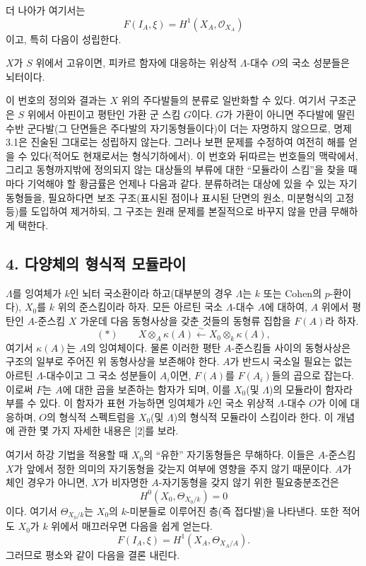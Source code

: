 더 나아가 여기서는
\[
  F(I_A,\xi)=H^1(X_A,\mathcal O_{X_A})
\]
이고, 특히 다음이 성립한다.

 $X$가 $S$ 위에서 고유이면, 피카르 함자에 대응하는
위상적 $\Lambda$-대수 $O$의 국소 성분들은 뇌터이다.

 이 번호의 정의와 결과는 $X$ 위의 주다발들의 분류로
일반화할 수 있다. 여기서 구조군은 $S$ 위에서 아핀이고 평탄인 가환 군
스킴 $G$이다. $G$가 가환이 아니면 주다발에 딸린 수반 군다발(그 단면들은
주다발의 자기동형들이다)이 더는 자명하지 않으므로, 명제 3.1은 진술된
그대로는 성립하지 않는다. 그러나 보편 문제를 수정하여 여전히 해를 얻을
수 있다(적어도 현재로서는 형식기하에서). 이 번호와 뒤따르는 번호들의
맥락에서, 그리고 동형까지밖에 정의되지 않는 대상들의 부류에 대한
``모듈라이 스킴''을 찾을 때마다 기억해야 할 황금률은 언제나 다음과 같다.
분류하려는 대상에 있을 수 있는 자기동형들을, 필요하다면 보조 구조(표시된
점이나 표시된 단면의 원소, 미분형식의 고정 등)를 도입하여 제거하되, 그
구조는 원래 문제를 본질적으로 바꾸지 않을 만큼 무해하게 택한다.

\subsection*{4. 다양체의 형식적 모듈라이}

$\Lambda$를 잉여체가 $k$인 뇌터 국소환이라 하고(대부분의 경우
$\Lambda$는 $k$ 또는 Cohen의 $p$-환이다), $X_0$를 $k$ 위의 준스킴이라
하자. 모든 아르틴 국소 $\Lambda$-대수 $A$에 대하여, $A$ 위에서 평탄인
$A$-준스킴 $X$ 가운데 다음 동형사상을 갖춘 것들의 동형류 집합을 $F(A)$라
하자.
\[
  (*)\qquad
  X\otimes_A\kappa(A)\xleftarrow{\sim}
  X_0\otimes_k\kappa(A),
\]
여기서 $\kappa(A)$는 $A$의 잉여체이다. 물론 이러한 평탄
$A$-준스킴들 사이의 동형사상은 구조의 일부로 주어진 위 동형사상을
보존해야 한다. $A$가 반드시 국소일 필요는 없는 아르틴
$\Lambda$-대수이고 그 국소 성분들이 $A_i$이면, $F(A)$를 $F(A_i)$들의
곱으로 잡는다. 이로써 $F$는 $A$에 대한 곱을 보존하는 함자가 되며, 이를
$X_0$(및 $\Lambda$)의 모듈라이 함자라 부를 수 있다. 이 함자가 표현
가능하면 잉여체가 $k$인 국소 위상적 $\Lambda$-대수 $O$가 이에 대응하며,
$O$의 형식적 스펙트럼을 $X_0$(및 $\Lambda$)의 형식적 모듈라이 스킴이라
한다. 이 개념에 관한 몇 가지 자세한 내용은 [2]를 보라.

여기서 하강 기법을 적용할 때 $X_0$의 ``유한'' 자기동형들은 무해하다.
이들은 $A$-준스킴 $X$가 앞에서 정한 의미의 자기동형을 갖는지 여부에
영향을 주지 않기 때문이다. $A$가 체인 경우가 아니면, $X$가 비자명한
$A$-자기동형을 갖지 않기 위한 필요충분조건은
\[
  H^0(X_0,\Theta_{X_0/k})=0
\]
이다. 여기서 $\Theta_{X_0/k}$는 $X_0$의 $k$-미분들로 이루어진 층(즉
접다발)을 나타낸다. 또한 적어도 $X_0$가 $k$ 위에서 매끄러우면 다음을
쉽게 얻는다.
\[
  F(I_A,\xi)=H^1(X_A,\Theta_{X_A/A}).
\]
그러므로 평소와 같이 다음을 결론 내린다.

